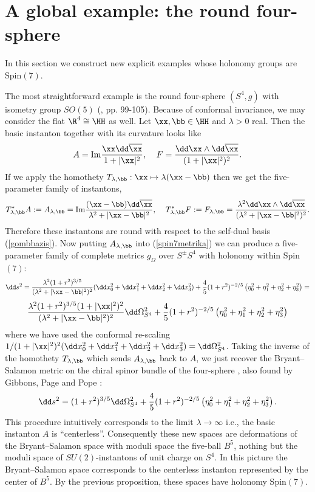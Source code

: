 \documentclass[a4paper,12pt,draft]{article}
\begin{document}
\section{A global example: the round four-sphere}

In this section we construct new explicit examples whose holonomy
groups are Spin$(7)$. 

The most straightforward example is the round four-sphere
$(S^4, g)$ with isometry group $SO(5)$ (\cite{fre-uhl},
pp. 99-105). Because of conformal invariance,
we may consider the flat $\R^4\cong\HH$ as well. Let $\xx
,\bb\in\HH$ and $\lambda >0$ real. Then the basic instanton together
with its curvature looks like
\[A = {\rm Im}{\xx\dd\overline{\xx }\over 1+|\xx
|^2},\:\:\:\:\:F={\dd\xx\wedge\dd\overline{\xx}\over
(1+\vert\xx\vert^2)^2}.\] 
If we apply the homothety $T_{\lambda
,\bb}: \xx\mapsto\lambda (\xx
-\bb )$ then we get the five-parameter family of instantons,
\[T^*_{\lambda ,\bb}A:=A_{\lambda , \bb }={\rm Im}{(\xx
-\bb)\dd\overline\xx \over 
\lambda^2+\vert\xx -\bb\vert^2}, \:\:\:\:\:T^*_{\lambda ,\bb}F:=F_{\lambda
,\bb}= {\lambda^2\dd\xx\wedge\dd\overline{\xx}\over
(\lambda^2+\vert\xx -\bb\vert^2)^2}.\]
Therefore these instantons are round with respect to the self-dual basis
(\ref{gombbazis}). Now putting $A_{\lambda , \bb }$ into
(\ref{spin7metrika}) we can produce a five-parameter family of complete
metrics $g_\Omega$ over $S^\pm S^4$ with holonomy within Spin$(7)$: 
\[\dd s^2= {\lambda^2(1+r^2)^{3/5}\over (\lambda^2+\vert\xx
-\bb\vert^2)^2}(\dd x_0^2+\dd x_1^2+\dd x_2^2+\dd x_3^2)+
{4\over 5}(1+r^2)^{-2/5}\left(\eta_0^2 +\eta_1^2 +\eta_2^2
+\eta_3^2\right) =\]
\[ {\lambda^2(1+r^2)^{3/5}(1+|\xx |^2)^2\over (\lambda^2+\vert\xx
-\bb\vert^2)^2}\dd\Omega^2_{S^4}+{4\over 5}(1+r^2)^{-2/5}\left(\eta_0^2
+\eta_1^2 +\eta_2^2 +\eta_3^2\right) \]
where we have used the conformal re-scaling $1/(1+|\xx |^2)^2(\dd
x_0^2+\dd x_1^2+\dd x_2^2+\dd x_3^2)=\dd\Omega^2_{S^4}$. Taking the
inverse of the homothety $T_{\lambda ,\bb}$ which sends $A_{\lambda ,\bb}$
back to $A$, we just recover the Bryant--Salamon metric on the chiral
spinor bundle of the four-sphere \cite{bry-sal}, also found by Gibbons,
Page and Pope \cite{gib-pag-pop}:
\[\dd s^2=(1+r^2)^{3/5}\dd\Omega^2_{S^4}+{4\over
5}(1+r^2)^{-2/5}\left(\eta_0^2
+\eta_1^2 +\eta_2^2 +\eta_3^2\right) .\] 
This procedure intuitively corresponds to
the limit $\lambda\rightarrow\infty$ i.e., the basic instanton 
$A$ is ``centerless''. Consequently these new
spaces are deformations of the Bryant--Salamon space with moduli space the
five-ball $B^5$, nothing but the moduli space of $SU(2)$-instantons of
unit charge on $S^4$. In this picture the Bryant--Salamon space
corresponds to the centerless instanton represented by the center of
$B^5$. By the previous proposition, these spaces have holonomy Spin$(7)$.
\end{document}
